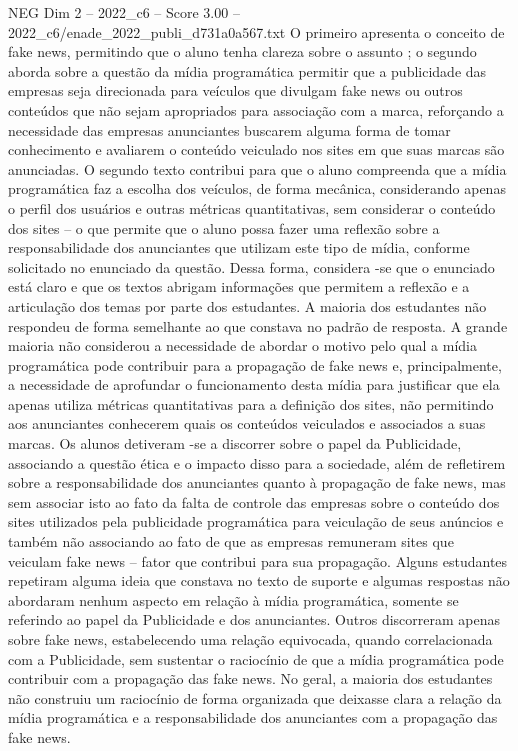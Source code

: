 \begin{textsample}{NEG Dim 2 – 2022\_c6 – Score 3.00 – 2022\_c6/enade\_2022\_publi\_d731a0a567.txt}
O primeiro apresenta o conceito de fake news, permitindo que o aluno tenha clareza sobre o assunto ; o segundo aborda sobre a questão da mídia programática permitir que a publicidade das empresas seja direcionada para veículos que divulgam fake news ou outros conteúdos que não sejam apropriados para associação com a marca, reforçando a necessidade das empresas anunciantes buscarem alguma forma de tomar conhecimento e avaliarem o conteúdo veiculado nos sites em que suas marcas são anunciadas.
O segundo texto contribui para que o aluno compreenda que a mídia programática faz a escolha dos veículos, de forma mecânica, considerando apenas o perfil dos usuários e outras métricas quantitativas, sem considerar o conteúdo dos sites – o que permite que o aluno possa fazer uma reflexão sobre a responsabilidade dos anunciantes que utilizam este tipo de mídia, conforme solicitado no enunciado da questão.
Dessa forma, considera -se que o enunciado está claro e que os textos abrigam informações que permitem a reflexão e a articulação dos temas por parte dos estudantes.
A maioria dos estudantes não respondeu de forma semelhante ao que constava no padrão de resposta.
A grande maioria não considerou a necessidade de abordar o motivo pelo qual a mídia programática pode contribuir para a propagação de fake news e, principalmente, a necessidade de aprofundar o funcionamento desta mídia para justificar que ela apenas utiliza métricas quantitativas para a definição dos sites, não permitindo aos anunciantes conhecerem quais os conteúdos veiculados e associados a suas marcas.
Os alunos detiveram -se a discorrer sobre o papel da Publicidade, associando a questão ética e o impacto disso para a sociedade, além de refletirem sobre a responsabilidade dos anunciantes quanto à propagação de fake news, mas sem associar isto ao fato da falta de controle das empresas sobre o conteúdo dos sites utilizados pela publicidade programática para veiculação de seus anúncios e também não associando ao fato de que as empresas remuneram sites que veiculam fake news – fator que contribui para sua propagação.
Alguns estudantes repetiram alguma ideia que constava no texto de suporte e algumas respostas não abordaram nenhum aspecto em relação à mídia programática, somente se referindo ao papel da Publicidade e dos anunciantes.
Outros discorreram apenas sobre fake news, estabelecendo uma relação equivocada, quando correlacionada com a Publicidade, sem sustentar o raciocínio de que a mídia programática pode contribuir com a propagação das fake news.
No geral, a maioria dos estudantes não construiu um raciocínio de forma organizada que deixasse clara a relação da mídia programática e a responsabilidade dos anunciantes com a propagação das fake news.

\end{textsample}
